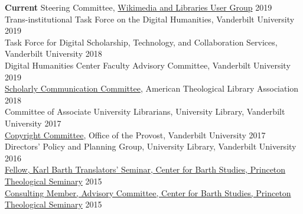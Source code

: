 \documentclass[10pt]{res} %
\begin{document}
\begin{resume}
{\bf Current} 
Steering Committee, \href{https://meta.wikimedia.org/wiki/Wikimedia_and_Libraries_User_Group}{Wikimedia and Libraries User Group} \hfill 2019\\ 
Trans-institutional Task Force on the Digital Humanities, Vanderbilt University \hfill 2019\\
Task Force for Digital Scholarship, Technology, and Collaboration Services, Vanderbilt University \hfill 2018\\
Digital Humanities Center Faculty Advisory Committee, Vanderbilt University \hfill 2019\\
\href{https://www.atla.com/about/committees-councils-task-forces/scholarly-communication-committee/}{Scholarly Communication Committee}, American Theological Library Association \hfill 2018\\
Committee of Associate University Librarians, University Library, Vanderbilt University \hfill 2017\\
\href{https://vanderbilt.edu/provost/people/cyrus/committees/copyright-committee.php}{Copyright Committee}, Office of the Provost, Vanderbilt University \hfill 2017\\
Directors' Policy and Planning Group, University Library, Vanderbilt University \hfill 2016\\
\href{http://barth.ptsem.edu/event/translators-seminar}{Fellow, Karl Barth Translators’ Seminar, Center for Barth Studies, Princeton Theological Seminary} \hfill 2015\\
\href{http://barth.ptsem.edu/about-cbs/the-advisory-committee}{Consulting Member, Advisory Committee, Center for Barth Studies, Princeton Theological Seminary}  \hfill 2015 \\


\end{resume}
\end{document}
